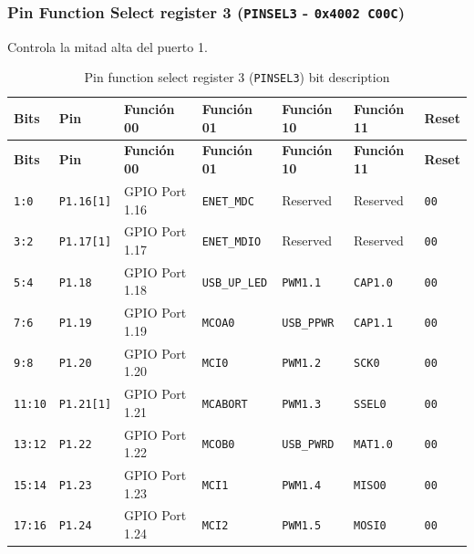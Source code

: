 \subsubsection{Pin Function Select register 3 (\texttt{PINSEL3} - \texttt{0x4002 C00C})}
Controla la mitad alta del puerto 1.

\begin{longtable}{|>{\raggedright\arraybackslash}p{}|>{\raggedright\arraybackslash}p{}|>{\raggedright\arraybackslash}p{}|>{\raggedright\arraybackslash}p{}|>{\raggedright\arraybackslash}p{}|>{\raggedright\arraybackslash}p{}|>{\centering\arraybackslash}p{}|}
\caption{Pin function select register 3 (\texttt{PINSEL3}) bit description}\\
\hline
\textbf{Bits} & \textbf{Pin} & \textbf{Función 00} & \textbf{Función 01} & \textbf{Función 10} & \textbf{Función 11} & \textbf{Reset} \\
\hline
\endfirsthead
\hline
\textbf{Bits} & \textbf{Pin} & \textbf{Función 00} & \textbf{Función 01} & \textbf{Función 10} & \textbf{Función 11} & \textbf{Reset} \\
\hline
\endhead
\texttt{1:0} & \texttt{P1.16[1]} & GPIO Port 1.16 & \texttt{ENET\_MDC} & Reserved & Reserved & \texttt{00} \\
\hline
\texttt{3:2} & \texttt{P1.17[1]} & GPIO Port 1.17 & \texttt{ENET\_MDIO} & Reserved & Reserved & \texttt{00} \\
\hline
\texttt{5:4} & \texttt{P1.18} & GPIO Port 1.18 & \texttt{USB\_UP\_LED} & \texttt{PWM1.1} & \texttt{CAP1.0} & \texttt{00} \\
\hline
\texttt{7:6} & \texttt{P1.19} & GPIO Port 1.19 & \texttt{MCOA0} & \texttt{USB\_PPWR} & \texttt{CAP1.1} & \texttt{00} \\
\hline
\texttt{9:8} & \texttt{P1.20} & GPIO Port 1.20 & \texttt{MCI0} & \texttt{PWM1.2} & \texttt{SCK0} & \texttt{00} \\
\hline
\texttt{11:10} & \texttt{P1.21[1]} & GPIO Port 1.21 & \texttt{MCABORT} & \texttt{PWM1.3} & \texttt{SSEL0} & \texttt{00} \\
\hline
\texttt{13:12} & \texttt{P1.22} & GPIO Port 1.22 & \texttt{MCOB0} & \texttt{USB\_PWRD} & \texttt{MAT1.0} & \texttt{00} \\
\hline
\texttt{15:14} & \texttt{P1.23} & GPIO Port 1.23 & \texttt{MCI1} & \texttt{PWM1.4} & \texttt{MISO0} & \texttt{00} \\
\hline
\texttt{17:16} & \texttt{P1.24} & GPIO Port 1.24 & \texttt{MCI2} & \texttt{PWM1.5} & \texttt{MOSI0} & \texttt{00} \\

\end{longtable}

